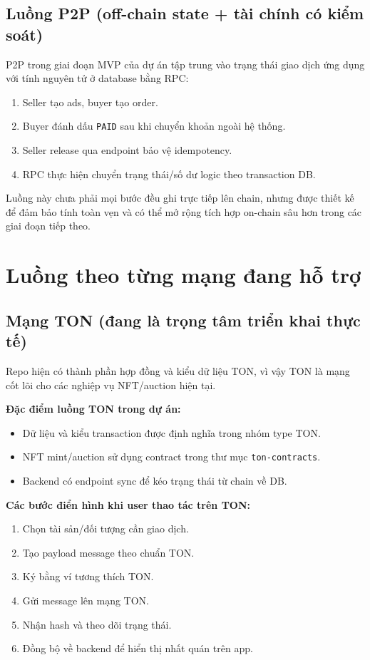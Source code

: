 \documentclass[a4paper,12pt]{report}
\begin{document}
\subsection{Luồng P2P (off-chain state + tài chính có kiểm soát)}
P2P trong giai đoạn MVP của dự án tập trung vào trạng thái giao dịch ứng dụng với tính nguyên tử ở database bằng RPC:
\begin{enumerate}
    \item Seller tạo ads, buyer tạo order.
    \item Buyer đánh dấu \texttt{PAID} sau khi chuyển khoản ngoài hệ thống.
    \item Seller release qua endpoint bảo vệ idempotency.
    \item RPC thực hiện chuyển trạng thái/số dư logic theo transaction DB.
\end{enumerate}
Luồng này chưa phải mọi bước đều ghi trực tiếp lên chain, nhưng được thiết kế để đảm bảo tính toàn vẹn và có thể mở rộng tích hợp on-chain sâu hơn trong các giai đoạn tiếp theo.

\section{Luồng theo từng mạng đang hỗ trợ}

\subsection{Mạng TON (đang là trọng tâm triển khai thực tế)}
Repo hiện có thành phần hợp đồng và kiểu dữ liệu TON, vì vậy TON là mạng cốt lõi cho các nghiệp vụ NFT/auction hiện tại.

\textbf{Đặc điểm luồng TON trong dự án:}
\begin{itemize}
    \item Dữ liệu và kiểu transaction được định nghĩa trong nhóm type TON.
    \item NFT mint/auction sử dụng contract trong thư mục \texttt{ton-contracts}.
    \item Backend có endpoint sync để kéo trạng thái từ chain về DB.
\end{itemize}

\textbf{Các bước điển hình khi user thao tác trên TON:}
\begin{enumerate}
    \item Chọn tài sản/đối tượng cần giao dịch.
    \item Tạo payload message theo chuẩn TON.
    \item Ký bằng ví tương thích TON.
    \item Gửi message lên mạng TON.
    \item Nhận hash và theo dõi trạng thái.
    \item Đồng bộ về backend để hiển thị nhất quán trên app.
\end{enumerate}
\end{document}
